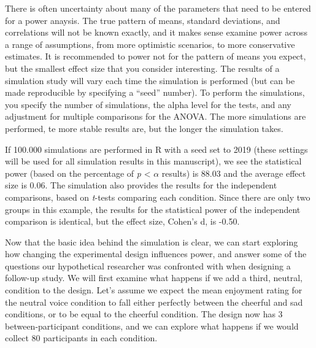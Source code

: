 \documentclass[,jou, draftfirst, a4paper,floatsintext]{apa6}
\begin{document}
There is often uncertainty about many of the parameters that need to be entered for a power anaysis.
The true pattern of means, standard deviations, and correlations will not be known exactly, and it makes sense examine power across a range of assumptions, from more optimistic scenarios, to more conservative estimates.
It is recommended to power not for the pattern of means you expect, but the smallest effect size that you consider interesting.
The results of a simulation study will vary each time the simulation is performed (but can be made reproducible by specifying a \enquote{seed} number).
To perform the simulations, you specify the number of simulations, the alpha level for the tests, and any adjustment for multiple comparisons for the ANOVA. The more simulations are performed, te more stable results are, but the longer the simulation takes.

If 100.000 simulations are performed in R with a seed set to 2019 (these settings will be used for all simulation results in this manuscript), we see the statistical power (based on the percentage of \emph{p} \textless{} \(\alpha\) results) is 88.03 and the average effect size is 0.06.
The simulation also provides the results for the independent comparisons, based on \emph{t}-tests comparing each condition.
Since there are only two groups in this example, the results for the statistical power of the independent comparison is identical, but the effect size, Cohen's d, is -0.50.

Now that the basic idea behind the simulation is clear, we can start exploring how changing the experimental design influences power, and answer some of the questions our hypothetical researcher was confronted with when designing a follow-up study.
We will first examine what happens if we add a third, neutral, condition to the design.
Let's assume we expect the mean enjoyment rating for the neutral voice condition to fall either perfectly between the cheerful and sad conditions, or to be equal to the cheerful condition.
The design now has 3 between-participant conditions, and we can explore what happens if we would collect 80 participants in each condition.
\end{document}
